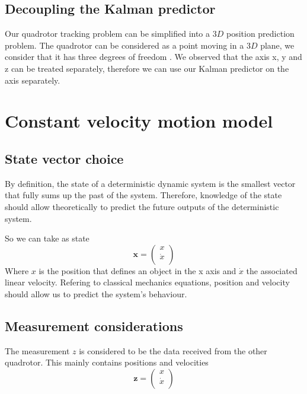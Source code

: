 \documentclass[12pt]{article}
\begin{document}
\subsection{Decoupling the Kalman predictor}
Our quadrotor tracking problem can be simplified into a $3D$ position prediction problem.
The quadrotor can be considered as a point moving in a $3D$ plane, we consider that it has three degrees of freedom .
We observed that the axis x, y and z can be treated separately, therefore we can use our Kalman predictor on the axis separately.

\section{Constant velocity motion model}

\subsection{State vector choice}
By definition, the state of a deterministic dynamic system is the smallest vector that fully sums up the past of the system.
Therefore, knowledge of the state should allow theoretically to predict the future outputs of the deterministic system.

So we can take as state
\begin{equation}
\mathbf{x} =
    \begin{pmatrix}
        x\\
        \dot{x}\\
    \end{pmatrix}
\end{equation}
Where $x$ is the position that defines an object in the x axis and $\dot{x}$ the associated linear velocity.
Refering to classical mechanics equations, position and velocity should allow us to predict the system's behaviour.

\subsection{Measurement considerations}
The measurement $z$ is considered to be the data received from the other quadrotor. This mainly contains positions and velocities
\begin{equation}
\mathbf{z} =
    \begin{pmatrix}
        x\\
        \dot{x}\\
    \end{pmatrix}
\label{measurement_cvmm}
\end{equation}
\end{document}
